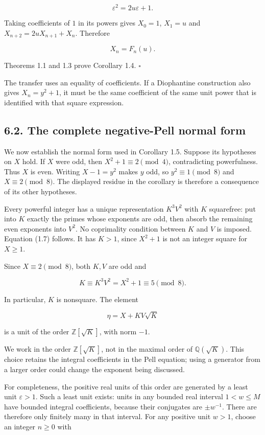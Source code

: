 \documentclass[11pt,a4paper]{article}
\begin{document}
\[
\varepsilon^2=2u\varepsilon+1.
\]

Taking coefficients of \(1\) in its powers gives \(X_0=1\), \(X_1=u\)
and \(X_{n+2}=2uX_{n+1}+X_n\). Therefore

\[
X_n=F_n(u).
\tag{6.1}
\]

Theorems 1.1 and 1.3 prove Corollary 1.4. \(\square\)

The transfer uses an equality of coefficients. If a Diophantine
construction also gives \(X_n=y^2+1\), it must be the same coefficient
of the same unit power that is identified with that square expression.

\subsection{6.2. The complete negative-Pell normal
form}\label{source-normal-form}

We now establish the normal form used in Corollary 1.5. Suppose its
hypotheses on \(X\) hold. If \(X\) were odd, then
\(X^2+1\equiv2\pmod4\), contradicting powerfulness. Thus \(X\) is even.
Writing \(X-1=y^2\) makes \(y\) odd, so \(y^2\equiv1\pmod8\) and
\(X\equiv2\pmod8\). The displayed residue in the corollary is therefore
a consequence of its other hypotheses.

Every powerful integer has a unique representation \(K^3V^2\) with \(K\)
squarefree: put into \(K\) exactly the primes whose exponents are odd,
then absorb the remaining even exponents into \(V^2\). No coprimality
condition between \(K\) and \(V\) is imposed. Equation (1.7) follows. It
has \(K>1\), since \(X^2+1\) is not an integer square for \(X\ge1\).

Since \(X\equiv2\pmod8\), both \(K,V\) are odd and

\[
K\equiv K^3V^2=X^2+1\equiv5\pmod8.
\tag{6.2}
\]

In particular, \(K\) is nonsquare. The element

\[
\eta=X+KV\sqrt K
\]

is a unit of the order \(\mathbb Z[\sqrt K]\), with norm \(-1\).

We work in the order \(\mathbb Z[\sqrt K]\), not in the maximal order of
\(\mathbb Q(\sqrt K)\). This choice retains the integral coefficients in
the Pell equation; using a generator from a larger order could change
the exponent being discussed.

For completeness, the positive real units of this order are generated by
a least unit \(\varepsilon>1\). Such a least unit exists: units in any
bounded real interval \(1<w\le M\) have bounded integral coefficients,
because their conjugates are \(\pm w^{-1}\). There are therefore only
finitely many in that interval. For any positive unit \(w>1\), choose an
integer \(n\ge0\) with
\end{document}

